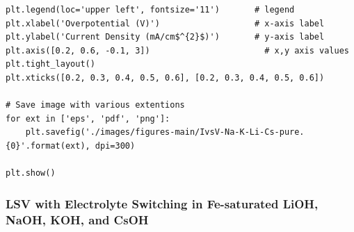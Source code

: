 \documentclass[journal=jpccck,manuscript=suppinfo,email=true]{achemso}
\begin{document}
\begin{verbatim}
plt.legend(loc='upper left', fontsize='11')       # legend
plt.xlabel('Overpotential (V)')                   # x-axis label
plt.ylabel('Current Density (mA/cm$^{2}$)')       # y-axis label
plt.axis([0.2, 0.6, -0.1, 3])                       # x,y axis values
plt.tight_layout()
plt.xticks([0.2, 0.3, 0.4, 0.5, 0.6], [0.2, 0.3, 0.4, 0.5, 0.6])

# Save image with various extentions
for ext in ['eps', 'pdf', 'png']:
    plt.savefig('./images/figures-main/IvsV-Na-K-Li-Cs-pure.{0}'.format(ext), dpi=300)

plt.show()
\end{verbatim}

\subsubsection{LSV with Electrolyte Switching in Fe-saturated LiOH, NaOH, KOH, and CsOH}
\label{sec-6-1-6}
\end{document}
